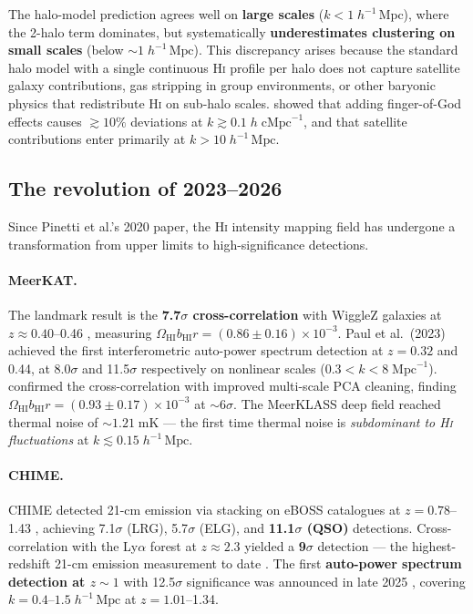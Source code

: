 \documentclass[10pt,a4paper]{article}
\newcommand{\OmHI}{\Omega_{\mathrm{HI}}}
\newcommand{\bHI}{b_{\mathrm{HI}}}
\newcommand{\hmpc}{h^{-1}\,\mathrm{Mpc}}
\begin{document}
The halo-model prediction agrees well on \textbf{large scales}
($k < 1\;\hmpc$), where the 2-halo term dominates, but systematically
\textbf{underestimates clustering on small scales} (below
$\sim\!1\;\hmpc$).  This discrepancy arises because the standard halo model
with a single continuous H\textsc{i} profile per halo does not capture
satellite galaxy contributions, gas stripping in group environments, or other
baryonic physics that redistribute H\textsc{i} on sub-halo scales.
\citet{Padmanabhan2023} showed that adding finger-of-God effects causes
$\gtrsim\!10\%$ deviations at $k \gtrsim 0.1\;h\;\mathrm{cMpc}^{-1}$, and
that satellite contributions enter primarily at $k > 10\;\hmpc$.


\subsection{The revolution of 2023--2026}

Since Pinetti et al.'s 2020 paper, the H\textsc{i} intensity mapping field has
undergone a transformation from upper limits to high-significance detections.

\paragraph{MeerKAT.}
The landmark result is the \textbf{7.7$\sigma$ cross-correlation} with WiggleZ
galaxies at $z \approx 0.40$--0.46 \citep{Cunnington2023}, measuring
$\OmHI \bHI r = (0.86 \pm 0.16) \times 10^{-3}$.  Paul et al.\ (2023)
achieved the first interferometric auto-power spectrum detection at $z = 0.32$
and 0.44, at 8.0$\sigma$ and 11.5$\sigma$ respectively on nonlinear scales
($0.3 < k < 8\;\mathrm{Mpc}^{-1}$).  \citet{Carucci2025} confirmed the
cross-correlation with improved multi-scale PCA cleaning, finding
$\OmHI \bHI r = (0.93 \pm 0.17) \times 10^{-3}$ at $\sim\!6\sigma$.  The
MeerKLASS deep field \citep{MeerKLASS2025} reached thermal noise of
$\sim\!1.21\;\mathrm{mK}$ --- the first time thermal noise is
\emph{subdominant to H\textsc{i} fluctuations} at
$k \lesssim 0.15\;\hmpc$.

\paragraph{CHIME.}
CHIME detected 21-cm emission via stacking on eBOSS catalogues at
$z = 0.78$--1.43 \citep{CHIME2023}, achieving 7.1$\sigma$ (LRG),
5.7$\sigma$ (ELG), and \textbf{11.1$\sigma$ (QSO)} detections.
Cross-correlation with the Ly$\alpha$ forest at $z \approx 2.3$ yielded a
\textbf{9$\sigma$} detection --- the highest-redshift 21-cm emission
measurement to date \citep{CHIME2024}.  The first \textbf{auto-power spectrum
detection at $z \sim 1$} with 12.5$\sigma$ significance was announced in late
2025 \citep{CHIME2025}, covering $k = 0.4$--$1.5\;\hmpc$ at $z = 1.01$--1.34.
\end{document}
